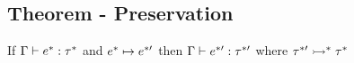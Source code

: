 \documentclass{article}
\begin{document}
\subsection{Theorem - Preservation}
If $\Gamma \vdash e^* : \tau^*$ and $e^* \mapsto e^{*\prime}$ then $\Gamma \vdash e^{*\prime} : \tau^{*\prime}$ where $\tau^{*\prime} \rightarrowtail^* \tau^*$

\end{document}
